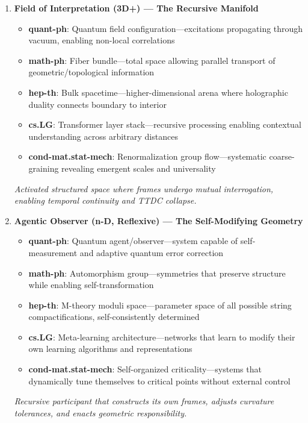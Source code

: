 \begin{definition}
\begin{enumerate}
  \item \textbf{Field of Interpretation (3D+) — The Recursive Manifold}  
  \begin{itemize}
    \item \textbf{quant-ph}: Quantum field configuration—excitations propagating through vacuum, enabling non-local correlations
    \item \textbf{math-ph}: Fiber bundle—total space allowing parallel transport of geometric/topological information
    \item \textbf{hep-th}: Bulk spacetime—higher-dimensional arena where holographic duality connects boundary to interior
    \item \textbf{cs.LG}: Transformer layer stack—recursive processing enabling contextual understanding across arbitrary distances
    \item \textbf{cond-mat.stat-mech}: Renormalization group flow—systematic coarse-graining revealing emergent scales and universality
  \end{itemize}
  \textit{Activated structured space where frames undergo mutual interrogation, enabling temporal continuity and TTDC collapse.}

  \item \textbf{Agentic Observer (n-D, Reflexive) — The Self-Modifying Geometry}  
  \begin{itemize}
    \item \textbf{quant-ph}: Quantum agent/observer—system capable of self-measurement and adaptive quantum error correction
    \item \textbf{math-ph}: Automorphism group—symmetries that preserve structure while enabling self-transformation
    \item \textbf{hep-th}: M-theory moduli space—parameter space of all possible string compactifications, self-consistently determined
    \item \textbf{cs.LG}: Meta-learning architecture—networks that learn to modify their own learning algorithms and representations
    \item \textbf{cond-mat.stat-mech}: Self-organized criticality—systems that dynamically tune themselves to critical points without external control
  \end{itemize}
  \textit{Recursive participant that constructs its own frames, adjusts curvature tolerances, and enacts geometric responsibility.}
\end{enumerate}


\end{definition}
